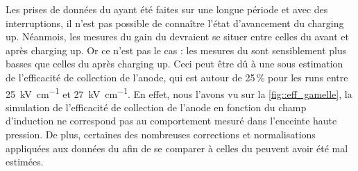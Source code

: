       Les prises de données du \TOO{} ayant été faites sur une longue période et avec des interruptions, il n'est pas possible de connaître l'état d'avancement du charging up. Néanmois, les mesures du gain du \TOO{} devraient se situer entre celles du \threeL{} avant et après charging up. Or ce n'est pas le cas : les mesures du \TOO{} sont sensiblement plus basses que celles du \threeL{} après charging up. Ceci peut être dû à une sous estimation de l'efficacité de collection de l'anode, qui est autour de 25\,\% pour les runs entre \SI{25}{\kilo\volt\per\centi\meter} et \SI{27}{\kilo\volt\per\centi\meter}. En effet, nous l'avons vu sur la \autoref{fig::eff_gamelle}, la simulation de l'efficacité de collection de l'anode en fonction du champ d'induction ne correspond pas au comportement mesuré dans l'enceinte haute pression. De plus, certaines des nombreuses corrections et normalisations appliquées aux données du \TOO{} afin de se comparer à celles du \threeL{} peuvent avoir été mal estimées.
%
%
